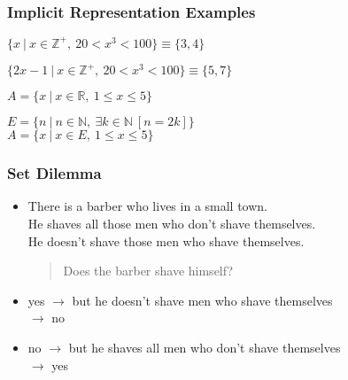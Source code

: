 \documentclass[dvipsnames]{beamer}
\begin{document}
\begin{frame}
  \frametitle{Implicit Representation Examples}

  \begin{example}
    $\{x~|~x \in \mathbb{Z}^+,~20 < x^3 < 100\} \equiv \{3,4\}$

    $\{2x-1~|~x \in \mathbb{Z}^+,~20 < x^3 < 100\} \equiv \{5,7\}$
  \end{example}

  \pause
  \begin{example}
    $A = \{x~|~x \in \mathbb{R},~1 \leq x \leq 5\}$
  \end{example}

  \pause
  \begin{example}
    $E = \{n~|~n \in \mathbb{N},~\exists k \in \mathbb{N}~[n=2k]\}$\\
    $A = \{x~|~x \in E,~1 \leq x \leq 5\}$
  \end{example}
\end{frame}

\begin{frame}
  \frametitle{Set Dilemma}

  \begin{itemize}
    \item There is a barber who lives in a small town.\\
      He shaves all those men who don't shave themselves.\\
      He doesn't shave those men who shave themselves.

    \smallskip
    \begin{quote}
      Does the barber shave himself?
    \end{quote}

    \pause
    \item yes $\rightarrow$ but he doesn't shave men who shave themselves\\
      $\rightarrow$ no

    \pause
    \item no $\rightarrow$ but he shaves all men who don't shave themselves\\
      $\rightarrow$ yes
  \end{itemize}
\end{frame}
\end{document}
